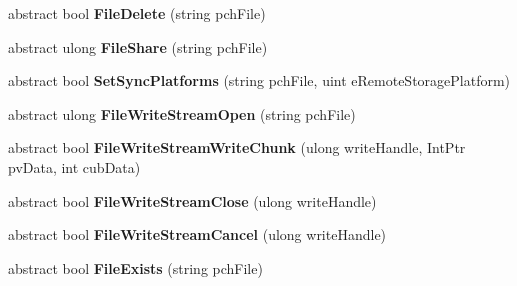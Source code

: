 \begin{DoxyCompactItemize}
\item 
\mbox{\label{class_valve_1_1_steamworks_1_1_i_steam_remote_storage_a4118a22cf4a4c10622624c4cef928daa}} 
abstract bool {\bfseries File\+Delete} (string pch\+File)
\item 
\mbox{\label{class_valve_1_1_steamworks_1_1_i_steam_remote_storage_ab3ec77a8b320c470b4e9746215833ccd}} 
abstract ulong {\bfseries File\+Share} (string pch\+File)
\item 
\mbox{\label{class_valve_1_1_steamworks_1_1_i_steam_remote_storage_a8522f36ac7183f00d32b1de81b45a917}} 
abstract bool {\bfseries Set\+Sync\+Platforms} (string pch\+File, uint e\+Remote\+Storage\+Platform)
\item 
\mbox{\label{class_valve_1_1_steamworks_1_1_i_steam_remote_storage_ab1df38082e3d0d76d6e2df1d372e4d2c}} 
abstract ulong {\bfseries File\+Write\+Stream\+Open} (string pch\+File)
\item 
\mbox{\label{class_valve_1_1_steamworks_1_1_i_steam_remote_storage_a5bb3b5a1375508660b3e534fc6759dde}} 
abstract bool {\bfseries File\+Write\+Stream\+Write\+Chunk} (ulong write\+Handle, Int\+Ptr pv\+Data, int cub\+Data)
\item 
\mbox{\label{class_valve_1_1_steamworks_1_1_i_steam_remote_storage_a238280d1cf6e8873969744cce95690b6}} 
abstract bool {\bfseries File\+Write\+Stream\+Close} (ulong write\+Handle)
\item 
\mbox{\label{class_valve_1_1_steamworks_1_1_i_steam_remote_storage_a510f61abfdf072eeee35e61acf602e32}} 
abstract bool {\bfseries File\+Write\+Stream\+Cancel} (ulong write\+Handle)
\item 
\mbox{\label{class_valve_1_1_steamworks_1_1_i_steam_remote_storage_ad8a7e6cf7191644d01114519a11cf776}} 
abstract bool {\bfseries File\+Exists} (string pch\+File)

\end{DoxyCompactItemize}
